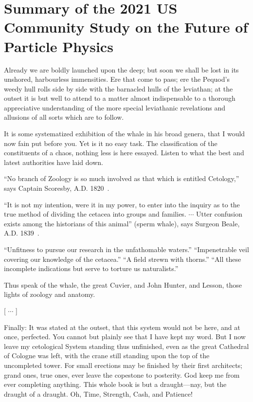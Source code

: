 

\chapter{Summary of the 2021 US Community Study on the Future of
  Particle Physics}



\vskip 0.4in

Already we are boldly launched upon the deep; but soon we shall be lost in its unshored, harbourless immensities. Ere that come to pass; ere the Pequod’s weedy hull rolls side by side with the barnacled hulls of the leviathan; at the outset it is but well to attend to a matter almost indispensable to a thorough appreciative understanding of the more special leviathanic revelations and allusions of all sorts which are to follow.

It is some systematized exhibition of the whale in his broad genera, that I would now fain put before you. Yet is it no easy task. The classification of the constituents of a chaos, nothing less is here essayed. Listen to what the best and latest authorities have laid down.

``No branch of Zoology is so much involved as that which is entitled Cetology,'' says Captain Scoresby, A.D. 1820~\cite{S-Scoresby}.

``It is not my intention, were it in my power, to enter into the
 inquiry as to the true method of dividing the cetacea into groups and
 families. $\cdots$ Utter confusion exists among the historians of
 this animal'' (sperm whale), says Surgeon Beale, A.D. 1839~\cite{S-Beale}.

``Unfitness to pursue our research in the unfathomable waters.''
 ``Impenetrable veil covering our knowledge of the cetacea.''  ``A
 field strewn with thorns.'' ``All these incomplete indications but
 serve
 to torture us naturalists.''~\cite{S-Cuvier,S-Hunter,S-Lesson}

Thus speak of the whale, the great Cuvier, and John Hunter, and
Lesson, those lights of zoology and anatomy. 

[ $\cdots$ ]

Finally: It was stated at the outset, that this system would not be here, and at once, perfected. You cannot but plainly see that I have kept my word. But I now leave my cetological System standing thus unfinished, even as the great Cathedral of Cologne was left, with the crane still standing upon the top of the uncompleted tower. For small erections may be finished by their first architects; grand ones, true ones, ever leave the copestone to posterity. God keep me from ever completing anything. This whole book is but a draught---nay, but the draught of a draught. Oh, Time, Strength, Cash, and Patience!


